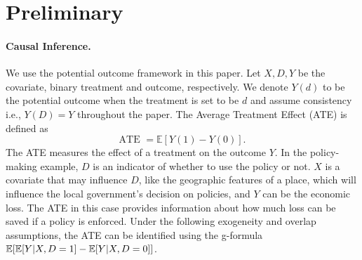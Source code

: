 \documentclass[12pt]{article}
\theoremstyle{plain}
\theoremstyle{definition}
\begin{document}
\section{Preliminary} \label{sec:prelin}

\paragraph{Causal Inference.} We use the potential outcome framework \cite{rubin1974estimating} in this paper. Let $X, D, Y$ be the covariate, binary treatment and outcome, respectively. We denote $Y (d)$ to be the potential outcome when the treatment is set to be $d$ and assume consistency i.e., $Y(D) = Y$ throughout the paper. The Average Treatment Effect (ATE) is defined as \[ \text{ATE } =\mathbb{E} [Y (1) - Y (0)]. \]
The ATE measures the effect of a treatment on the outcome $Y$. In the policy-making example, $D$ is an indicator of whether to use the policy or not. $X$ is a covariate that may influence $D$, like the geographic features of a place, which will influence the local government's decision on policies, and $Y$ can be the economic loss. The ATE in this case provides information about how much loss can be saved if a policy is enforced. Under the following exogeneity and overlap assumptions, the ATE can be identified using the g-formula $\mathbb{E} [\mathbb{E} [Y | X, D = 1 ] -\mathbb{E} [Y | X, D = 0] ]$.
\end{document}
